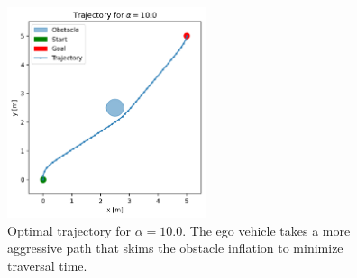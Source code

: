 \documentclass [11pt]{article}
\begin{document}
\begin{enumerate}[label=(\roman*)]
        \begin{figure}[H]
            \centering
            \includegraphics[width=0.52\textwidth]{figs/p1_traj_alpha_10p0.png}
            \caption{Optimal trajectory for $\alpha = 10.0$. The ego vehicle takes a more aggressive path that skims the obstacle inflation to minimize traversal time.}
            \label{fig:p1_alpha10}
        \end{figure}

    \end{enumerate}
\end{document}
